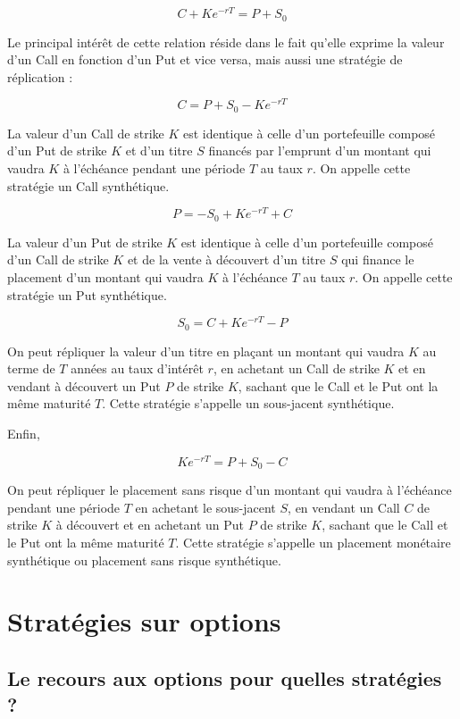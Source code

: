 \documentclass[a4paper, 12pt]{report}
\begin{document}
\[
C + K e^{-rT} = P + S_0 
\]

Le principal intérêt de cette relation réside dans le fait qu’elle exprime la valeur d’un Call en fonction d’un Put et vice versa, mais aussi une stratégie de réplication :

\[
C = P + S_0 - K e^{-rT} 
\]

La valeur d’un Call de strike \( K \) est identique à celle d’un portefeuille composé d’un Put de strike \( K \) et d’un titre \( S \) financés par l’emprunt d’un montant qui vaudra \( K \) à l’échéance pendant une période \( T \) au taux \( r \). On appelle cette stratégie un Call synthétique.

\[
P = -S_0 + K e^{-rT} + C 
\]

La valeur d’un Put de strike \( K \) est identique à celle d’un portefeuille composé d’un Call de strike \( K \) et de la vente à découvert d’un titre \( S \) qui finance le placement d’un montant qui vaudra \( K \) à l’échéance \( T \) au taux \( r \). On appelle cette stratégie un Put synthétique.

\[
S_0 = C + K e^{-rT} - P 
\]

On peut répliquer la valeur d’un titre en plaçant un montant qui vaudra \( K \) au terme de \( T \) années au taux d’intérêt \( r \), en achetant un Call de strike \( K \) et en vendant à découvert un Put \( P \) de strike \( K \), sachant que le Call et le Put ont la même maturité \( T \). Cette stratégie s’appelle un sous-jacent synthétique.

Enfin,

\[
K e^{-rT} = P + S_0 - C 
\]

On peut répliquer le placement sans risque d’un montant qui vaudra à l’échéance pendant une période \( T \) en achetant le sous-jacent \( S \), en vendant un Call \( C \) de strike \( K \) à découvert et en achetant un Put \( P \) de strike \( K \), sachant que le Call et le Put ont la même maturité \( T \). Cette stratégie s’appelle un placement monétaire synthétique ou placement sans risque synthétique.

\section{Stratégies sur options}

\subsection{Le recours aux options pour quelles stratégies ?}
\end{document}
